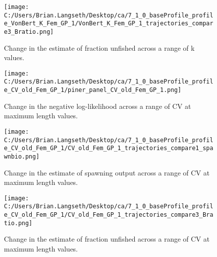 \documentclass[11pt,
  english,
  a4paper,
]{article}
\begin{document}
\tagmcend\tagstructend


\begin{figure}
\centering
\texttt{[image: C:/Users/Brian.Langseth/Desktop/ca/7\_1\_0\_baseProfile\_profile\_VonBert\_K\_Fem\_GP\_1/VonBert\_K\_Fem\_GP\_1\_trajectories\_compare3\_Bratio.png]}
\caption{Change in the estimate of fraction unfished across a range of k values.\label{fig:k-depl}}
\end{figure}

\tagmcend\tagstructend


\begin{figure}
\centering
\texttt{[image: C:/Users/Brian.Langseth/Desktop/ca/7\_1\_0\_baseProfile\_profile\_CV\_old\_Fem\_GP\_1/piner\_panel\_CV\_old\_Fem\_GP\_1.png]}
\caption{Change in the negative log-likelihood across a range of CV at maximum length values.\label{fig:cv2-profile}}
\end{figure}

\tagmcend\tagstructend


\begin{figure}
\centering
\texttt{[image: C:/Users/Brian.Langseth/Desktop/ca/7\_1\_0\_baseProfile\_profile\_CV\_old\_Fem\_GP\_1/CV\_old\_Fem\_GP\_1\_trajectories\_compare1\_spawnbio.png]}
\caption{Change in the estimate of spawning output across a range of CV at maximum length values.\label{fig:cv2-ssb}}
\end{figure}

\tagmcend\tagstructend


\begin{figure}
\centering
\texttt{[image: C:/Users/Brian.Langseth/Desktop/ca/7\_1\_0\_baseProfile\_profile\_CV\_old\_Fem\_GP\_1/CV\_old\_Fem\_GP\_1\_trajectories\_compare3\_Bratio.png]}
\caption{Change in the estimate of fraction unfished across a range of CV at maximum length values.\label{fig:cv2-depl}}
\end{figure}
\end{document}
